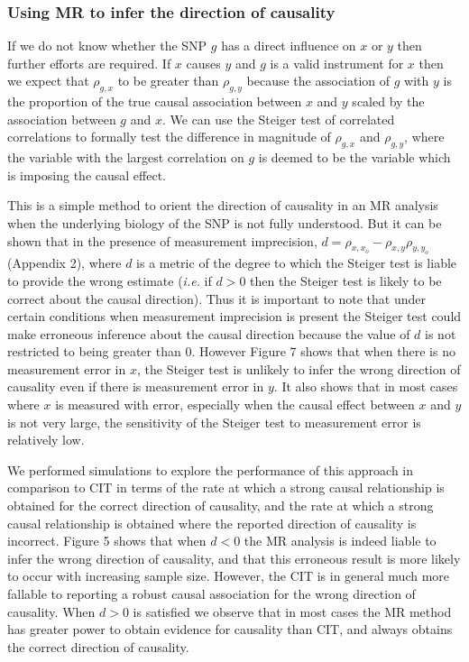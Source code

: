 \documentclass[]{article}
\begin{document}
\subsubsection{Using MR to infer the direction of
causality}\label{using-mr-to-infer-the-direction-of-causality}

If we do not know whether the SNP \(g\) has a direct influence on \(x\)
or \(y\) then further efforts are required. If \(x\) causes \(y\) and
\(g\) is a valid instrument for \(x\) then we expect that \(\rho_{g,x}\)
to be greater than \(\rho_{g,y}\) because the association of \(g\) with
\(y\) is the proportion of the true causal association between \(x\) and
\(y\) scaled by the association between \(g\) and \(x\). We can use the
Steiger test of correlated correlations to formally test the difference
in magnitude of \(\rho_{g,x}\) and \(\rho_{g,y}\), where the variable
with the largest correlation on \(g\) is deemed to be the variable which
is imposing the causal effect.

This is a simple method to orient the direction of causality in an MR
analysis when the underlying biology of the SNP is not fully understood.
But it can be shown that in the presence of measurement imprecision,
\(d = \rho_{x, x_o} - \rho_{x,y}\rho_{y,y_o}\) (Appendix 2), where \(d\)
is a metric of the degree to which the Steiger test is liable to provide
the wrong estimate (\emph{i.e.} if \(d>0\) then the Steiger test is
likely to be correct about the causal direction). Thus it is important
to note that under certain conditions when measurement imprecision is
present the Steiger test could make erroneous inference about the causal
direction because the value of \(d\) is not restricted to being greater
than 0. However Figure 7 shows that when there is no measurement error
in \(x\), the Steiger test is unlikely to infer the wrong direction of
causality even if there is measurement error in \(y\). It also shows
that in most cases where \(x\) is measured with error, especially when
the causal effect between \(x\) and \(y\) is not very large, the
sensitivity of the Steiger test to measurement error is relatively low.

We performed simulations to explore the performance of this approach in
comparison to CIT in terms of the rate at which a strong causal
relationship is obtained for the correct direction of causality, and the
rate at which a strong causal relationship is obtained where the
reported direction of causality is incorrect. Figure 5 shows that when
\(d < 0\) the MR analysis is indeed liable to infer the wrong direction
of causality, and that this erroneous result is more likely to occur
with increasing sample size. However, the CIT is in general much more
fallable to reporting a robust causal association for the wrong
direction of causality. When \(d > 0\) is satisfied we observe that in
most cases the MR method has greater power to obtain evidence for
causality than CIT, and always obtains the correct direction of
causality.
\end{document}
